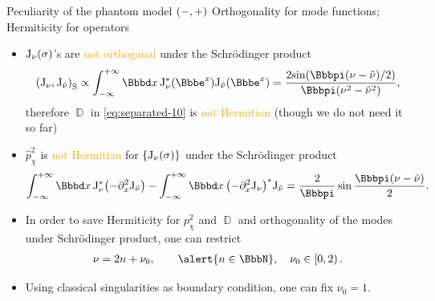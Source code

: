 \documentclass[9pt]{beamer}
\begin{document}
\begin{frame}%
{Peculiarity of the phantom model ${\left(-,+\right)}$}%
{Orthogonality for mode functions; Hermiticity for operators}
\begin{itemize}

\item ${\mathrm{J}_{\nu}}\mathopen{}\left(\sigma\right)\mathclose{}$'s are
\textcolor{orange}{not orthogonal} under the Schrödinger product
\begin{align}
\rbr{\mathrm{J}_{\nu},\mathrm{J}_{\tilde{\nu}}}_\text{S}
\propto \int_{-\infty}^{+\infty} \dd x\,
\rfun{\mathrm{J}_{\nu}^*}{\ee^x}
\rfun{\mathrm{J}_{\tilde{\nu}}}{\ee^x} =
\frac{2\rfun{\sin}{\pp\rbr{\nu-\tilde{\nu}}/2}}{\pp\rbr{\nu^2-\tilde{\nu}^2}},
\end{align}
therefore $\BbbD$ in \cref{eq:separated-10} is
\textcolor{orange}{not Hermitian} (though we do not need it so far)

\item $\widehat{p}_\chi^2$ is \textcolor{orange}{not Hermitian} for
${\left\{{\mathrm{J}_{\nu}}\mathopen{}\left(\sigma\right)\mathclose{}\right\}}$ under the Schrödinger product
\begin{align}
\int_{-\infty}^{+\infty} \dd x\,
\mathrm{J}_{\nu}^*\rbr{-\partial_x^2\mathrm{J}_{\tilde{\nu}}}
-\int_{-\infty}^{+\infty} \dd x\,
\rbr{-\partial_x^2\mathrm{J}_{\nu}}^*\mathrm{J}_{\tilde{\nu}}
= \frac{2}{\pp}\sin\frac{\pp\rbr{\nu-\tilde{\nu}}}{2}.
\end{align}

\item In order to save Hermiticity for $p_\chi^2$ and $\BbbD$ and 
orthogonality of the modes under Schrödinger product, one can restrict
\begin{align}
\nu = 2n+\nu_0,\qquad \alert{n\in\BbbN},\quad\nu_0\in \left[0,2\right).
\end{align}

\item Using classical singularities as boundary condition, one can fix
$\nu_0 = 1$.
\end{itemize}

\end{frame}
\end{document}
